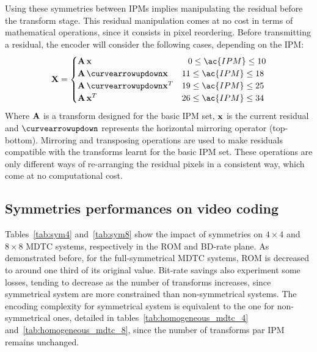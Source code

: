 \documentclass[11pt,a4paper,openright,twoside]{book}
\numberwithin{equation}{section} %
\numberwithin{figure}{section} %
\numberwithin{table}{section} %
\begin{document}
Using these symmetries between \acp{IPM} implies manipulating the residual
before the transform stage.
This residual manipulation comes at no cost in terms of mathematical
operations, since it consists in pixel reordering.
Before transmitting a residual, the encoder will consider the following cases,
depending on the \ac{IPM}:
\begin{equation}
	\X =
	\begin{cases}
		\A \, \x & \;\;\, 0 \le \ac{IPM} \le 10 \\
		\A \, \curvearrowupdown\x & 11 \le \ac{IPM} \le 18 \\
		\A \, \curvearrowupdown\x^T & 19 \le \ac{IPM} \le 25 \\
		\A \, \x^T & 26 \le \ac{IPM} \le 34 \\
	\end{cases}
\end{equation}
Where $\mathbf{A}$ is a transform designed for the basic IPM set, $\mathbf{x}$ is the current
residual and $\curvearrowupdown$ represents the horizontal mirroring operator
(top-bottom).
Mirroring and transposing operations are used to make residuals compatible
with the transforms learnt for the basic IPM set.
These operations are only different ways of re-arranging the residual pixels
in a consistent way, which come at no computational cost.

\subsection{Symmetries performances on video coding}
\label{sub:symmetries_performances_on_video_coding}

Tables~\ref{tab:sym4} and~\ref{tab:sym8} show the impact of symmetries on
$4\times4$ and $8\times8$ \ac{MDTC} systems, respectively in the \acs{ROM} and
\ac{BD}-rate plane.
As demonstrated before, for the full-symmetrical \ac{MDTC} systems, \acs{ROM}
is decreased to around one third of its original value.
Bit-rate savings also experiment some losses, tending to decrease as the
number of transforms increases, since symmetrical system are more constrained
than non-symmetrical systems.
The encoding complexity for symmetrical system is equivalent to the one for
non-symmetrical ones, detailed in tables~\ref{tab:homogeneous_mdtc_4}
and~\ref{tab:homogeneous_mdtc_8}, since the number of transforms par \ac{IPM}
remains unchanged.
\end{document}
